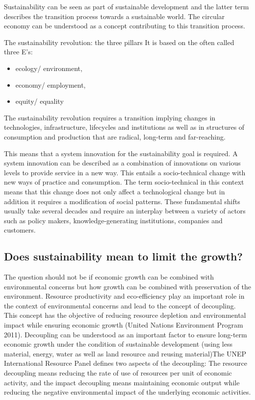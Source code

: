 \documentclass{article}
\begin{document}
Sustainability can be seen as part of sustainable development and the latter term describes
the transition process towards a sustainable world.
The circular economy can be understood as a concept contributing to this transition process.

The sustainability revolution: the three pillars
It is based on the often called three E’s:
\begin{itemize}
	\item ecology/ environment,
	\item economy/ employment,
	\item equity/ equality
\end{itemize}

The sustainability revolution requires a transition implying changes in technologies,
infrastructure, lifecycles and institutions as well as in structures of consumption and production
that are radical, long-term and far-reaching.

This means that a system innovation for the sustainability goal is required.
A system innovation can be described as a combination of innovations on various levels to
provide service in a new way.
This entails a socio-technical change with new ways of practice and consumption. The term
socio-technical in this context means that this change does not only affect a technological
change but in addition it requires a modification of social patterns. These fundamental shifts
usually take several decades and require an interplay between a variety of actors such as
policy makers, knowledge-generating institutions, companies and customers.

\subsection{Does sustainability mean to limit the growth?}
The question should not be if economic growth can be combined with environmental concerns but
how growth can be combined with preservation of the environment.
Resource productivity and eco-efficiency play an important role in the context of environmental
concerns and lead to the concept of decoupling.
This concept has the objective of reducing resource depletion and environmental impact while
ensuring economic growth (United Nations Environment Program 2011).
Decoupling can be understood as an important factor to ensure long-term economic growth
under the condition of sustainable development (using less material, energy, water as well as
land resource and reusing material)The UNEP International Resource Panel defines two aspects of the decoupling:
The resource decoupling means reducing the rate of use of resources per unit of
economic activity, and the impact decoupling means maintaining economic output while
reducing the negative environmental impact of the underlying economic activities.
\end{document}
